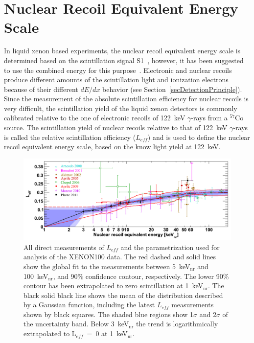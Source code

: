 \section{Nuclear Recoil Equivalent Energy Scale}
\label{secLeff}


In liquid xenon based experiments, the nuclear recoil equivalent energy scale is determined based on the scintillation signal S1~\cite{xe10-independent, NR_Zeplin}, however, it has been suggested to use the combined energy for this purpose~\cite{CESshutt}. Electronic and nuclear recoils produce different amounts of the scintillation light and ionization electrons because of their different $dE/dx$ behavior (see Section~\ref{secDetectionPrinciple}). Since the measurement of the absolute scintillation efficiency for nuclear recoils is very difficult, the scintillation yield of the liquid xenon detectors is commonly calibrated relative to the one of electronic recoils of 122~keV $\gamma$-rays from a $^{57}$Co source. The scintillation yield of nuclear recoils relative to that of 122~keV $\gamma$-rays is called the relative scintillation efficiency ($L_{eff}$) and is used to define the nuclear recoil equivalent energy scale, based on the know light yield at 122~keV.

\begin{figure}[!b]
\centering
\includegraphics[width=1.0\linewidth]{plots/run08/run08_Leff_mod1.png}
\caption[All direct measurements of $L_{eff}$ and the parametrization used for analysis of the XENON100 data]{All direct measurements of $L_{eff}$ and the parametrization used for analysis of the XENON100 data. 
The red dashed and solid lines show the global fit to the measurements between 5~keV$_{\mathrm{nr}}$ and 100~keV$_{\mathrm{nr}}$, and 90\% confidence contour, respectively. The lower 90\% contour has been extrapolated to zero scintillation at 1~keV$_{\mathrm{nr}}$. 
The black solid black line shows the mean of the distribution described by a Gaussian function, including the latest $L_{eff}$ measurements~\cite{LeffPlante} shown by black squares. The shaded blue regions show 1$\sigma$ and 2$\sigma$ of the uncertainty band. Below 3~keV$_{\mathrm{nr}}$ the trend is logarithmically extrapolated to L$_{eff}$~=~0 at 1~keV$_{\mathrm{nr}}$. }
\label{figLeffRun08}
\end{figure}

